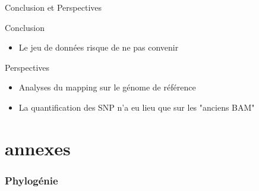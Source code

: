 \begin{frame}{Conclusion et Perspectives}
    \begin{alertblock}{Conclusion}
        \begin{itemize}
            \item Le jeu de données risque de ne pas convenir
        \end{itemize}
    \end{alertblock}

    \pause

    

    \begin{exampleblock}{Perspectives}
        \begin{itemize}
            \item Analyses du mapping sur le génome de référence
            \item La quantification des SNP n'a eu lieu que sur les "anciens BAM"
        \end{itemize}
    \end{exampleblock}

\end{frame}


%
%       


\appendix
\section*{annexes}
\begin{frame}
   \frametitle{Phylogénie}
   
\end{frame}


